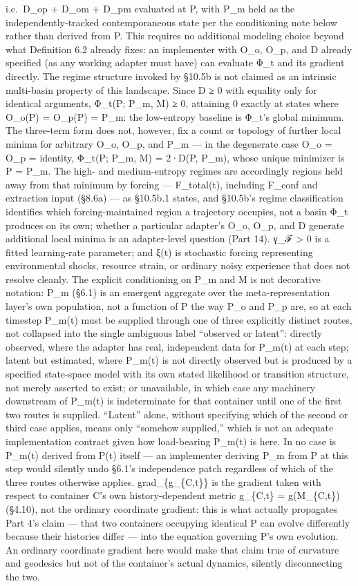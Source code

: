 \documentclass[
]{article}
\begin{document}
i.e.~D\_op + D\_om + D\_pm evaluated at P, with P\_m held as the
independently-tracked contemporaneous state per the conditioning note
below rather than derived from P. This requires no additional modeling
choice beyond what Definition 6.2 already fixes: an implementer with
O\_o, O\_p, and D already specified (as any working adapter must have)
can evaluate Φ\_t and its gradient directly. The regime structure
invoked by §10.5b is not claimed as an intrinsic multi-basin property of
this landscape. Since D ≥ 0 with equality only for identical arguments,
Φ\_t(P; P\_m, M) ≥ 0, attaining 0 exactly at states where O\_o(P) =
O\_p(P) = P\_m: the low-entropy baseline is Φ\_t's global minimum. The
three-term form does not, however, fix a count or topology of further
local minima for arbitrary O\_o, O\_p, and P\_m --- in the degenerate
case O\_o = O\_p = identity, Φ\_t(P; P\_m, M) = 2·D(P, P\_m), whose
unique minimizer is P = P\_m. The high- and medium-entropy regimes are
accordingly regions held away from that minimum by forcing ---
F\_total(t), including F\_conf and extraction input (§8.6a) --- as
§10.5b.1 states, and §10.5b's regime classification identifies which
forcing-maintained region a trajectory occupies, not a basin Φ\_t
produces on its own; whether a particular adapter's O\_o, O\_p, and D
generate additional local minima is an adapter-level question (Part 14).
γ\_ℱ \textgreater{} 0 is a fitted learning-rate parameter; and ξ(t) is
stochastic forcing representing environmental shocks, resource strain,
or ordinary noisy experience that does not resolve cleanly. The explicit
conditioning on P\_m and M is not decorative notation: P\_m (§6.1) is an
emergent aggregate over the meta-representation layer's own population,
not a function of P the way P\_o and P\_p are, so at each timestep
P\_m(t) must be supplied through one of three explicitly distinct
routes, not collapsed into the single ambiguous label ``observed or
latent'': directly observed, where the adapter has real, independent
data for P\_m(t) at each step; latent but estimated, where P\_m(t) is
not directly observed but is produced by a specified state-space model
with its own stated likelihood or transition structure, not merely
asserted to exist; or unavailable, in which case any machinery
downstream of P\_m(t) is indeterminate for that container until one of
the first two routes is supplied. ``Latent'' alone, without specifying
which of the second or third case applies, means only ``somehow
supplied,'' which is not an adequate implementation contract given how
load-bearing P\_m(t) is here. In no case is P\_m(t) derived from P(t)
itself --- an implementer deriving P\_m from P at this step would
silently undo §6.1's independence patch regardless of which of the three
routes otherwise applies. grad\_\{g\_\{C,t\}\} is the gradient taken
with respect to container C's own history-dependent metric g\_\{C,t\} =
g(M\_\{C,t\}) (§4.10), not the ordinary coordinate gradient: this is
what actually propagates Part 4's claim --- that two containers
occupying identical P can evolve differently because their histories
differ --- into the equation governing P's own evolution. An ordinary
coordinate gradient here would make that claim true of curvature and
geodesics but not of the container's actual dynamics, silently
disconnecting the two.
\end{document}
